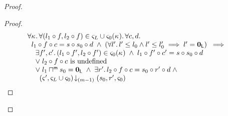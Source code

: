 \begin{lemma}[]
\begin{proof}
\begin{proof}
\begin{align}
	&\begin{array}{l}
		\for{\ca{}} \for{(l_1 \composeL f, l_2 \composeL f) \in \amod{L} \cup \amod{0}(\ca{})} \for{c, d} \\
  \hspace*{0.2cm} l_1 \composeL f \composeL c = s \composeL s_0 \composeL d \;\land\; \left(\for{l'} l' \leq l_0 \land l' \leq l'_0 \implies l' = \unitL\right)  \;\implies\\
  \hspace*{0.4cm}\exsts{f', c'} (l_1 \composeL f', l_2 \composeL f') \in \amod{0}(\ca{}) \;\land\; l_1 \composeL f' \composeL c' =  s \composeL s_0 \composeL d\\
		\hspace*{0.4cm}\lor\;l_2 \composeL f \composeL c \text{ is undefined}\\
		\hspace*{0.4cm}\lor\; l_1 \maxMeetL s_0 = \unitL \;\land\; \exsts{r'} l_2 \composeL f \composeL c = s_0 \composeL r' \composeL d \;\land\\
		\hspace*{0.6cm} \extendsAMUpto{\amod{}', \amod{L} \cup \amod{0}}{(m-1)}{s_0}{r'}{\amod{0}}
%		
	\end{array} \label{LAW:Goal9}
\end{align}
%


\end{proof}
\end{proof}
\end{lemma}
